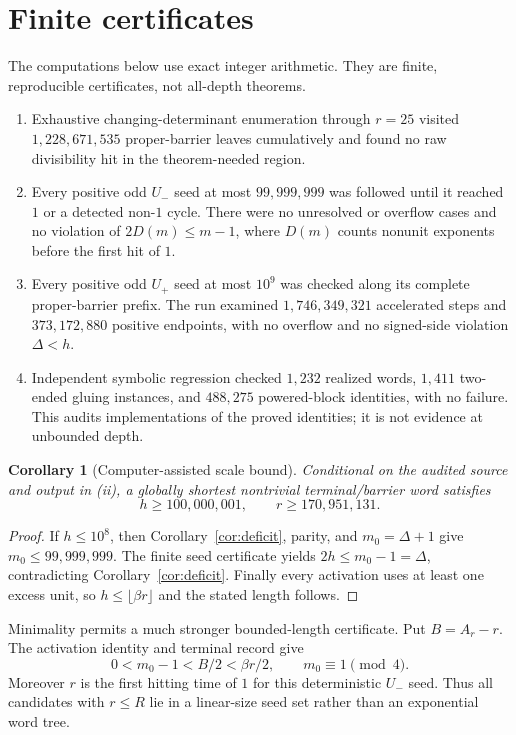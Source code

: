 \documentclass[11pt,reqno]{amsart}
\newtheorem{corollary}[theorem]{Corollary}
\theoremstyle{remark}
\newcommand{\Up}{U_{+}}
\newcommand{\Um}{U_{-}}
\begin{document}
\section{Finite certificates}

The computations below use exact integer arithmetic.  They are finite,
reproducible certificates, not all-depth theorems.

\begin{enumerate}[label=\textup{(\roman*)}]
\item Exhaustive changing-determinant enumeration through $r=25$ visited
$1{,}228{,}671{,}535$ proper-barrier leaves cumulatively and found no raw
divisibility hit in the theorem-needed region.
\item Every positive odd $\Um$ seed at most $99{,}999{,}999$ was followed
until it reached $1$ or a detected non-$1$ cycle.  There were no unresolved
or overflow cases and no violation of $2D(m)\le m-1$, where $D(m)$ counts
nonunit exponents before the first hit of $1$.
\item Every positive odd $\Up$ seed at most $10^9$ was checked along its
complete proper-barrier prefix.  The run examined $1{,}746{,}349{,}321$
accelerated steps and $373{,}172{,}880$ positive endpoints, with no overflow
and no signed-side violation $\Delta<h$.
\item Independent symbolic regression checked $1{,}232$ realized words,
$1{,}411$ two-ended gluing instances, and $488{,}275$ powered-block
identities, with no failure.  This audits implementations of the proved
identities; it is not evidence at unbounded depth.
\end{enumerate}

\begin{corollary}[Computer-assisted scale bound]\label{cor:scale}
Conditional on the audited source and output in (ii), a globally shortest
nontrivial terminal/barrier word satisfies
\[
 h\ge100{,}000{,}001,\qquad r\ge170{,}951{,}131.       \tag{8.1}
\]
\end{corollary}

\begin{proof}
If $h\le10^8$, then Corollary~\ref{cor:deficit}, parity, and
$m_0=\Delta+1$ give
$m_0\le99{,}999{,}999$.  The finite seed certificate yields
$2h\le m_0-1=\Delta$, contradicting
Corollary~\ref{cor:deficit}.  Finally every activation uses
at least one excess unit, so
$h\le\lfloor\beta r\rfloor$ and the stated length follows.
\end{proof}

Minimality permits a much stronger bounded-length certificate.  Put
$B=A_r-r$.  The activation identity and terminal record give
\[
 0<m_0-1<B/2<\beta r/2,\qquad m_0\equiv1\pmod4.      \tag{8.2}
\]
Moreover $r$ is the first hitting time of $1$ for this deterministic
$\Um$ seed.  Thus all candidates with $r\le R$ lie in a linear-size seed
set rather than an exponential word tree.
\end{document}
